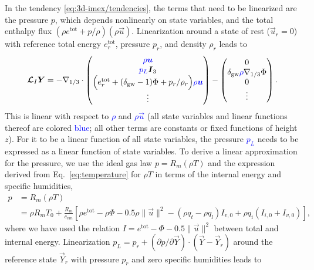 \documentclass{report}
\begin{document}
{In the tendency \eqref{eq:3d-imex/tendencies}, the terms that need to be linearized are the pressure $p$, which depends nonlinearly on state variables, and the total enthalpy flux $(\rho e^{\mathrm{tot}} + p/\rho) (\rho \vec{u})$. Linearization around a state of rest ($\vec{u}_r=0$) with reference total energy $e^{\mathrm{tot}}_r$, pressure $p_r$, and density $\rho_r$ leads to
 \begin{equation}\label{e:IMEX_linear}
 \vec{\mathcal{L}}_I \vec{Y} = 
 -\nabla_{1/3} \cdot \begin{pmatrix}
 \textcolor{blue}{\rho \vec{u}} \\
 \textcolor{blue}{p_L} \vec{I}_3  \\
 \Bigl(e^{\mathrm{tot}}_r  + (\delta_{\mathrm{gw}}-1)\Phi + p_r/\rho_r \Bigr) \textcolor{blue}{\rho \vec{u}}\\
\vdots
\end{pmatrix}
-
\begin{pmatrix}
0 \\
\delta_{\mathrm{gw}} \textcolor{blue} \rho \nabla_{1/3} \Phi \\
0\\
\vdots
\end{pmatrix}.
\end{equation}
This is linear with respect to \textcolor{blue}{$\rho$} and \textcolor{blue}{$\rho \vec{u}$} (all state variables and linear functions thereof are colored \textcolor{blue}{blue}; all other terms are constants or fixed functions of height $z$). For it to be a linear function of all state variables, the pressure \textcolor{blue}{$p_L$} needs to be expressed as a linear function of state variables. To derive a linear approximation for the pressure, we use the ideal gas law $p = R_m (\rho T)$ and the expression derived from Eq.~\eqref{eq:temperature} for $\rho T$ in terms of the internal energy and specific humidities,
\begin{equation}\label{e:pressure}
\begin{split}
p &= R_m (\rho T) \\
  &= \rho R_m T_0 + \frac{R_m}{c_{vm}} \left[\rho e^{\mathrm{tot}} - \rho \Phi - 0.5 \rho \|\vec{u}\|^2 - (\rho q_t - \rho q_l) I_{v,0} + \rho q_i (I_{i,0} + I_{v,0}) \right],
\end{split}
\end{equation}
where we have used the relation $I = e^{\mathrm{tot}} - \Phi - 0.5 \|\vec{u}\|^2$ between total and internal energy. Linearization $p_L = p_r + (\partial p/\partial\vec{Y})\cdot(\vec{Y}-\vec{Y}_r)$ around the reference state $\vec{Y}_r$ with pressure $p_r$ and zero specific humidities leads to 
}
\end{document}

